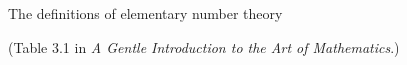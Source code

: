 \documentclass{article}
\begin{document}
\thispagestyle{empty}

\centerline{\Large The definitions of elementary number theory}
\centerline{(Table 3.1 in {\em A Gentle Introduction to the Art of Mathematics}.)}

\vspace{.5in}


\end{document}

